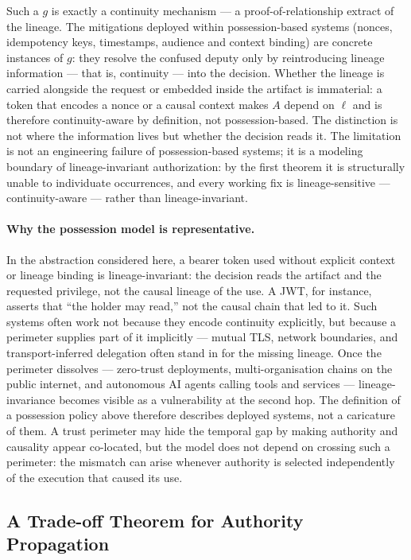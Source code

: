 \documentclass[11pt]{article}
\begin{document}
Such a $g$ is exactly a continuity mechanism --- a proof-of-relationship extract
of the lineage. The mitigations deployed within possession-based systems
(nonces, idempotency keys, timestamps, audience and context binding) are
concrete instances of $g$: they resolve the confused deputy only by
reintroducing lineage information --- that is, continuity --- into the decision.
Whether the lineage is carried alongside the request or embedded inside the
artifact is immaterial: a token that encodes a nonce or a causal context makes
$A$ depend on $\ell$ and is therefore continuity-aware by definition, not
possession-based. The distinction is not where the information lives but whether
the decision reads it. The limitation is not an engineering failure of possession-based systems; it is
a modeling boundary of lineage-invariant authorization: by the first theorem it
is structurally unable to individuate occurrences, and every working fix is
lineage-sensitive --- continuity-aware --- rather than lineage-invariant.

\paragraph{Why the possession model is representative.}
In the abstraction considered here, a bearer token used without explicit context
or lineage binding is lineage-invariant: the decision reads the artifact and the
requested privilege, not the causal lineage of the use. A JWT, for instance,
asserts that ``the holder may read,'' not the causal chain that led to it. Such systems often work not because they
encode continuity explicitly, but because a perimeter supplies part of it
implicitly ---
mutual TLS, network boundaries, and transport-inferred delegation often stand in
for the missing lineage. Once the perimeter dissolves --- zero-trust deployments,
multi-organisation chains on the public internet, and autonomous AI agents
calling tools and services --- lineage-invariance becomes visible as a
vulnerability at the second hop. The definition of a possession policy above
therefore describes deployed systems, not a caricature of them. A trust perimeter
may hide the temporal gap by making authority and causality appear co-located,
but the model does not depend on crossing such a perimeter: the mismatch can
arise whenever authority is selected independently of the execution that caused
its use.

\subsection{A Trade-off Theorem for Authority Propagation}
\end{document}
